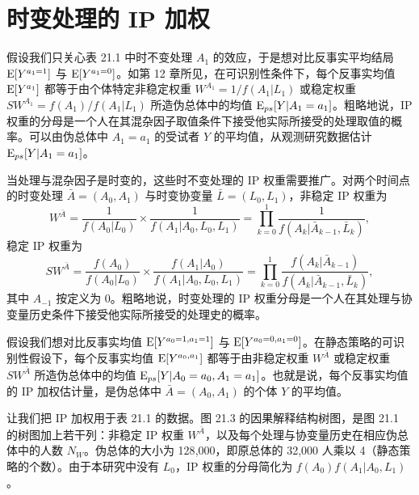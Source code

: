 \section{时变处理的 IP 加权}

假设我们只关心表 21.1 中时不变处理 $A_1$ 的效应，于是想对比反事实平均结局 $\mathrm{E}[Y^{a_1=1}]$ 与 $\mathrm{E}[Y^{a_1=0}]$。如第 12 章所见，在可识别性条件下，每个反事实均值 $\mathrm{E}[Y^{a_1}]$ 都等于由个体特定非稳定权重 $W^{A_1}=1/f(A_1|L_1)$ 或稳定权重 $SW^{A_1}=f(A_1)/f(A_1|L_1)$ 所造伪总体中的均值 $\mathrm{E}_{ps}[Y|A_1=a_1]$。粗略地说，IP 权重的分母是一个人在其混杂因子取值条件下接受他实际所接受的处理取值的概率。可以由伪总体中 $A_1=a_1$ 的受试者 $Y$ 的平均值，从观测研究数据估计 $\mathrm{E}_{ps}[Y|A_1=a_1]$。

当处理与混杂因子是时变的，这些时不变处理的 IP 权重需要推广。对两个时间点的时变处理 $\bar A=(A_0,A_1)$ 与时变协变量 $\bar L=(L_0,L_1)$，非稳定 IP 权重为
\[
W^{\bar A}=\frac{1}{f(A_0|L_0)}\times\frac{1}{f(A_1|A_0,L_0,L_1)}=\prod_{k=0}^{1}\frac{1}{f(A_k|\bar A_{k-1},\bar L_k)},
\]
稳定 IP 权重为
\[
SW^{\bar A}=\frac{f(A_0)}{f(A_0|L_0)}\times\frac{f(A_1|A_0)}{f(A_1|A_0,L_0,L_1)}=\prod_{k=0}^{1}\frac{f(A_k|\bar A_{k-1})}{f(A_k|\bar A_{k-1},\bar L_k)},
\]
其中 $A_{-1}$ 按定义为 0。粗略地说，时变处理的 IP 权重分母是一个人在其处理与协变量历史条件下接受他实际所接受的处理史的概率。

假设我们想对比反事实均值 $\mathrm{E}[Y^{a_0=1,a_1=1}]$ 与 $\mathrm{E}[Y^{a_0=0,a_1=0}]$。在静态策略的可识别性假设下，每个反事实均值 $\mathrm{E}[Y^{a_0,a_1}]$ 都等于由非稳定权重 $W^{\bar A}$ 或稳定权重 $SW^{\bar A}$ 所造伪总体中的均值 $\mathrm{E}_{ps}[Y|A_0=a_0,A_1=a_1]$。也就是说，每个反事实均值的 IP 加权估计量，是伪总体中 $\bar A=(A_0,A_1)$ 的个体 $Y$ 的平均值。

让我们把 IP 加权用于表 21.1 的数据。图 21.3 的因果解释结构树图，是图 21.1 的树图加上若干列：非稳定 IP 权重 $W^{\bar A}$，以及每个处理与协变量历史在相应伪总体中的人数 $N_W$。伪总体的大小为 128{,}000，即原总体的 32{,}000 人乘以 4（静态策略的个数）。由于本研究中没有 $L_0$，IP 权重的分母简化为 $f(A_0)f(A_1|A_0,L_1)$。


